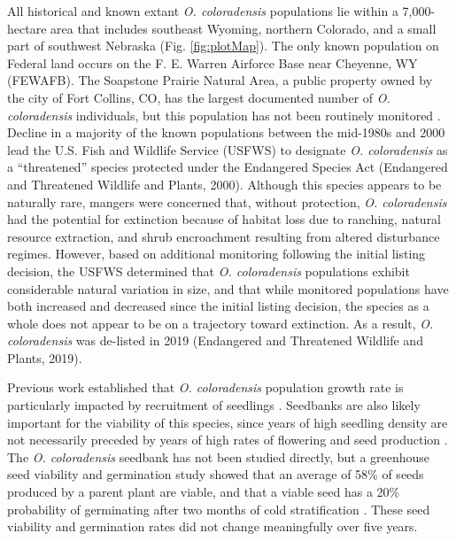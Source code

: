 \documentclass[12pt, letterpaper]{article}
\begin{document}
All historical and known extant \textit{O. coloradensis} populations lie within a 7,000-hectare area that includes southeast Wyoming, northern Colorado, and a small part of southwest Nebraska (Fig. \ref{fig:plotMap}). The only known population on Federal land occurs on the F. E. Warren Airforce Base near Cheyenne, WY (FEWAFB). The Soapstone Prairie Natural Area, a public property owned by the city of Fort Collins, CO, has the largest documented number of \textit{O. coloradensis} individuals, but this population has not been routinely monitored \cite{Heidel202133-YearWyoming}. Decline in a majority of the known populations between the mid-1980s and 2000 lead the U.S. Fish and Wildlife Service (USFWS) to designate \textit{O. coloradensis} as a “threatened” species protected under the Endangered Species Act (Endangered and Threatened Wildlife and Plants, 2000). Although this species appears to be naturally rare, mangers were concerned that, without protection, \textit{O. coloradensis} had the potential for extinction because of habitat loss due to ranching, natural resource extraction, and shrub encroachment resulting from altered disturbance regimes. However, based on additional monitoring following the initial listing decision, the USFWS determined that \textit{O. coloradensis} populations exhibit considerable natural variation in size, and that while monitored populations have both increased and decreased since the initial listing decision, the species as a whole does not appear to be on a trajectory toward extinction. As a result, \textit{O. coloradensis} was de-listed in 2019 (Endangered and Threatened Wildlife and Plants, 2019).
\nocite{USFWS2019}
\nocite{USFWS2000}


Previous work established that \textit{O. coloradensis} population growth rate is particularly impacted by recruitment of seedlings \cite{Floyd1998}. Seedbanks are also likely important for the viability of this species, since years of high seedling density are not necessarily preceded by years of high rates of flowering and seed production \cite{Munk2002RosetteSpecies, Heidel202133-YearWyoming}. The \textit{O. coloradensis} seedbank has not been studied directly, but a greenhouse seed viability and germination study showed that an average of 58\% of seeds produced by a parent plant are viable, and that a viable seed has a 20\% probability of germinating after two months of cold stratification \cite{Burgess2005CapsuleColoradensis}. These seed viability and germination rates did not change meaningfully over five years. 
\end{document}
